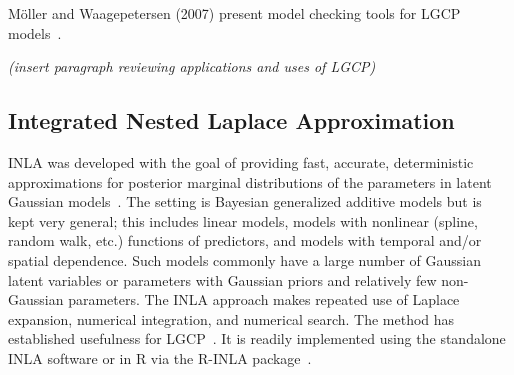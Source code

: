 \documentclass[]{interact}
\begin{document}

M\"{o}ller and Waagepetersen (2007) present model checking tools for LGCP
models~\cite{moellerwaagepetersen}.

{\it (insert paragraph reviewing applications and uses of LGCP)}


\subsection{Integrated Nested Laplace Approximation}
\label{inla}

INLA was developed with the goal of providing fast, accurate, deterministic
approximations for posterior marginal distributions of the parameters in
latent Gaussian models~\cite{rueetal}. The setting is Bayesian generalized
additive models but is kept very general; this includes linear models, models
with nonlinear (spline, random walk, etc.) functions of predictors, and models
with temporal and/or spatial dependence. Such models commonly have a large
number of Gaussian latent variables or parameters with Gaussian priors and
relatively few non-Gaussian parameters. The INLA approach makes repeated use
of Laplace expansion, numerical integration, and numerical search. The method
has established usefulness for LGCP~\cite{illianetal}. It is readily
implemented using the standalone INLA software or in R via the
R-INLA package~\cite{inlar}.









\end{document}
